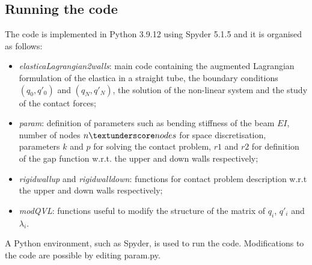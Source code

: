 \subsection{Running the code}

The code is implemented in Python 3.9.12 using Spyder 5.1.5 and it is organised as follows: \begin{itemize}
	\item \textit{elastica\textunderscore Lagrangian\textunderscore 2walls}: main code containing the augmented Lagrangian formulation of the elastica in a straight tube, the boundary conditions $(q_0,q'_0)$ and $(q_N, q'_N)$, the solution of the non-linear system and the study of the contact forces;
	\item \textit{param}: definition of parameters such as bending stiffness of the beam $EI$, number of nodes $n\textunderscore nodes$ for space discretisation, parameters $k$ and $p$ for solving the contact problem, $r1$ and $r2$ for definition of the gap function w.r.t. the upper and down walls respectively;
	\item \textit{rigid\textunderscore wall\textunderscore up} and \textit{rigid\textunderscore wall\textunderscore down}: functions for contact problem description w.r.t the upper and down walls respectively;
	\item \textit{mod\textunderscore QVL}: functions useful to modify the structure of the matrix of $q_i$, $q'_i$ and $\lambda_i$.  
\end{itemize}

A Python environment, such as Spyder, is used to run the code. Modifications to the code are possible by editing param.py.




